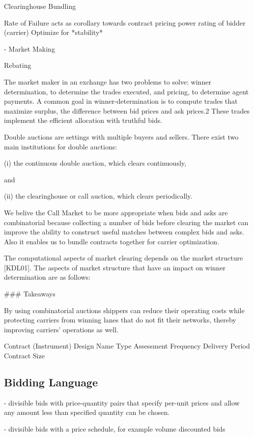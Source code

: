 \documentclass{article}
\begin{document}
Clearinghouse Bundling

Rate of Failure acts as corollary towards contract pricing power rating of bidder (carrier)
Optimize for *stability* 


- Market Making 

Rebating 

The market maker in an exchange has two problems to solve:
winner determination, to determine the trades executed, and pricing, to determine agent payments. A common goal in
winner-determination is to compute trades that maximize
surplus, the difference between bid prices and ask prices.2
These trades implement the efficient allocation with truthful bids.

Double auctions are settings with multiple buyers and sellers. There exist two main institutions for
double auctions: 

(i) the continuous double auction, which clears continuously,

and 

(ii) the clearinghouse or call auction, which clears periodically. 

We belive the Call Market to be more appropriate when bids and asks are combinatorial because collecting a number of bids before clearing the market can improve the ability to construct useful matches between complex bids and asks. Also it enables us to bundle contracts together for carrier optimization.

The computational aspects of market clearing depends on the market structure [KDL01]. The aspects of market structure that have an impact on winner
determination are as follows:

### Takeaways

By using combinatorial auctions shippers can reduce their operating costs while protecting carriers from winning lanes that do not fit their networks, thereby improving carriers' operations as well.

Contract (Instrument) Design
Name
Type
Assessment Frequency
Delivery Period
Contract Size

\subsection{Bidding Language}  

- divisible bids with price-quantity pairs that specify per-unit prices and
allow any amount less than specified quantity can be chosen.

- divisible bids with a price schedule, for example volume discounted bids
\end{document}

